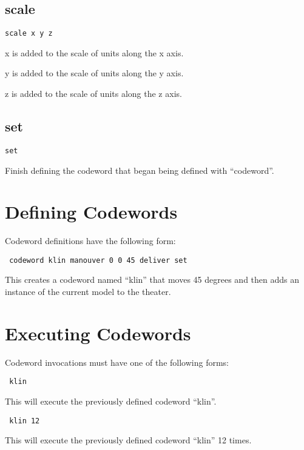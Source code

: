 \documentclass[12pt]{article}
\begin{document}
\subsection{scale}

\texttt{scale x y z}

x is added to the scale of units along the x axis.

y is added to the scale of units along the y axis.

z is added to the scale of units along the z axis.

\subsection{set}

\texttt{set}

Finish defining the codeword that began being defined with ``codeword''.

\section{Defining Codewords}

Codeword definitions have the following form:

\texttt{
codeword klin
  manouver 0 0 45
  deliver
set
}

This creates a codeword named ``klin'' that moves 45 degrees and then adds an instance of the current model to the theater.

\section{Executing Codewords}

Codeword invocations must have one of the following forms:

\texttt{
klin
}

This will execute the previously defined codeword ``klin''.

\texttt{
klin 12
}

This will execute the previously defined codeword ``klin'' 12 times.
\end{document}
